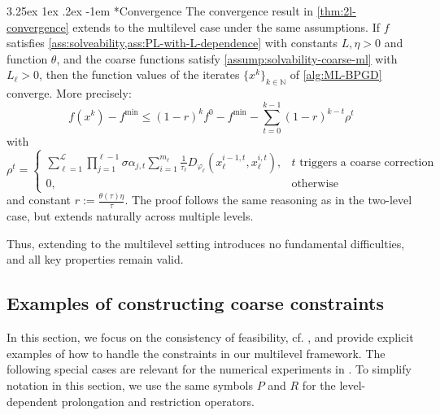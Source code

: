 \documentclass[11pt,reqno]{amsart}
\makeatletter
\numberwithin{equation}{section}
\numberwithin{figure}{section}
\theoremstyle{plain}
\theoremstyle{definition}
\newcommand{\mc}[1]{\mathcal{#1}}
\newcommand{\N}{\mathbb{N}}
\newcommand{\vphi}{\varphi}
\renewcommand\paragraph{\@startsection{paragraph}{4}{0pt}%
  {3.25ex \@plus 1ex \@minus .2ex}%
  {-1em}
  {\normalfont\itshape}*}
\makeatother
\begin{document}
\paragraph{Convergence} 
The convergence result in \cref{thm:2l-convergence} extends to the multilevel case under the same assumptions. If $f$ satisfies \cref{ass:solveability,ass:PL-with-L-dependence} with constants $L, \eta > 0$ and function $\theta$, and the coarse functions satisfy \cref{assump:solvability-coarse-ml} with $L_\ell > 0$, then the function values of the iterates $\{x^k\}_{k \in \N}$ of \cref{alg:ML-BPGD} converge. More precisely:
\begin{equation}
    f(x^k) - f^{\min} \leq (1-r)^k f^0 - f^{\min} - \sum_{t = 0}^{k-1}(1-r)^{k-t}\rho^t
\end{equation}
with 
\begin{equation}
    \rho^t = 
    \begin{cases}
       \sum_{\ell = 1}^{\mc{L}} \prod_{j = 1}^{\ell - 1} \sigma \alpha_{j,t} \sum_{i = 1}^{m_\ell} \frac{1}{\tau_\ell} D_{\vphi_\ell}(x_\ell^{i-1,t}, x_\ell^{i,t}), &t \text{ triggers a coarse correction} \\
        0, &\text{otherwise}
    \end{cases}
\end{equation}
and constant $r := \frac{\theta(\tau) \eta}{\tau}$. The proof follows the same reasoning as in the two-level case, but extends naturally across multiple levels.

Thus, extending to the multilevel setting introduces no fundamental difficulties, and all key properties remain valid.

\subsection{Examples of constructing coarse constraints}
In this section, we focus on the consistency of feasibility, cf. , and provide explicit examples of how to handle the constraints in our multilevel framework. The following special cases are relevant for the numerical experiments in .
To simplify notation in this section, we use the same symbols $P$ and $R$ for the level-dependent prolongation and restriction operators.
\end{document}

